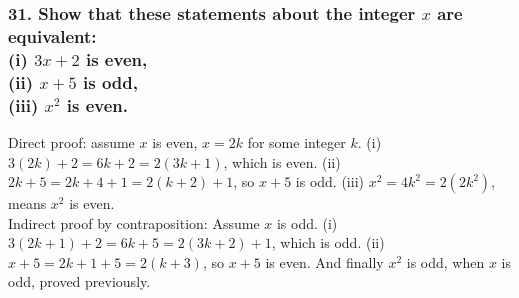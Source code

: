 \documentclass[11pt, oneside]{article} %
\numberwithin{equation}{section} %
\numberwithin{figure}{section} %
\numberwithin{table}{section} %
\begin{document}
\subsubsection{31. Show that these statements about the integer $x$ are equivalent: \\
(i) $3x+2$ is even,\\
(ii) $x+5$ is odd,\\
(iii) $x^2$ is even.}
Direct proof: assume $x$ is even, $x= 2k$ for some integer $k$. (i) $3(2k)+2 = 6k + 2 = 2(3k+1)$, which is even. (ii) $2k + 5 = 2k + 4 + 1 = 2(k+2) +1$, so $x+5$ is odd. (iii) $x^2 = 4k^2=2(2k^2)$, means $x^2$ is even.\\
Indirect proof by contraposition: Assume $x$ is odd. (i) $3(2k+1)+2=6k+5=2(3k+2)+1$, which is odd. (ii) $x+5 =2k+1+5=2(k+3)$, so $x+5$ is even. And finally $x^2$ is odd, when $x$ is odd, proved previously.
\end{document}
